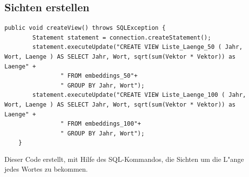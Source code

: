 \subsection{Sichten erstellen}
\begin{lstlisting}[style=Java]
public void createView() throws SQLException {
        Statement statement = connection.createStatement();
        statement.executeUpdate("CREATE VIEW Liste_Laenge_50 ( Jahr, Wort, Laenge ) AS SELECT Jahr, Wort, sqrt(sum(Vektor * Vektor)) as Laenge" +
                " FROM embeddings_50"+
                " GROUP BY Jahr, Wort");
        statement.executeUpdate("CREATE VIEW Liste_Laenge_100 ( Jahr, Wort, Laenge ) AS SELECT Jahr, Wort, sqrt(sum(Vektor * Vektor)) as Laenge" +
                " FROM embeddings_100"+
                " GROUP BY Jahr, Wort");
    }
\end{lstlisting}
Dieser Code erstellt, mit Hilfe des SQL-Kommandos, die Sichten um die L"ange jedes Wortes zu bekommen.

